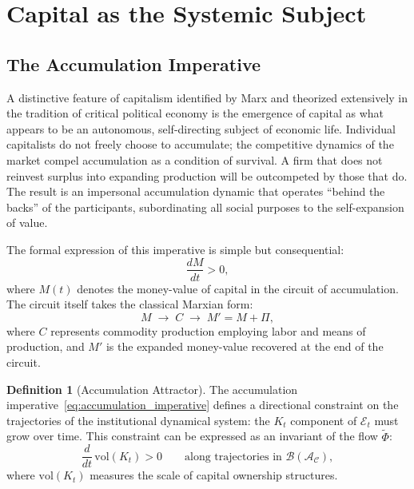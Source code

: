\documentclass[12pt,a4paper]{article}
\theoremstyle{definition}
\newtheorem{definition}{Definition}[section]
\theoremstyle{remark}
\begin{document}
\section{Capital as the Systemic Subject}
\label{sec:capital_subject}

\subsection{The Accumulation Imperative}

A distinctive feature of capitalism identified by Marx and theorized extensively in the tradition of critical political economy is the emergence of capital as what appears to be an autonomous, self-directing subject of economic life. Individual capitalists do not freely choose to accumulate; the competitive dynamics of the market compel accumulation as a condition of survival. A firm that does not reinvest surplus into expanding production will be outcompeted by those that do. The result is an impersonal accumulation dynamic that operates ``behind the backs'' of the participants, subordinating all social purposes to the self-expansion of value.

The formal expression of this imperative is simple but consequential:
\begin{equation}
  \label{eq:accumulation_imperative}
  \frac{dM}{dt} > 0,
\end{equation}
where $M(t)$ denotes the money-value of capital in the circuit of accumulation. The circuit itself takes the classical Marxian form:
\begin{equation}
  \label{eq:capital_circuit}
  M \;\longrightarrow\; C \;\longrightarrow\; M' = M + \Pi,
\end{equation}
where $C$ represents commodity production employing labor and means of production, and $M'$ is the expanded money-value recovered at the end of the circuit.

\begin{definition}[Accumulation Attractor]
The accumulation imperative~\eqref{eq:accumulation_imperative} defines a directional constraint on the trajectories of the institutional dynamical system: the $K_t$ component of $\mathcal{E}_t$ must grow over time. This constraint can be expressed as an invariant of the flow $\tilde\Phi$:
\begin{equation}
  \frac{d}{dt}\,\mathrm{vol}(K_t) > 0 \qquad \text{along trajectories in } \mathcal{B}(\mathcal{A}_\mathcal{C}),
\end{equation}
where $\mathrm{vol}(K_t)$ measures the scale of capital ownership structures.
\end{definition}
\end{document}
